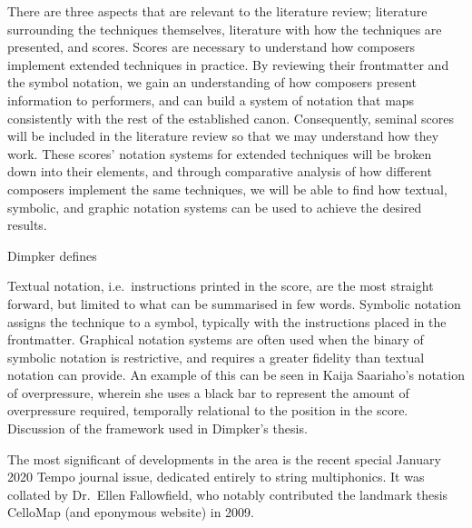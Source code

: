 There are three aspects that are relevant to the literature review; literature surrounding the techniques themselves, literature with how the techniques are presented, and scores. 
Scores are necessary to understand how composers implement extended techniques in practice.
By reviewing their frontmatter and the symbol notation, we gain an understanding of how composers present information to performers, and can build a system of notation that maps consistently with the rest of the established canon.
Consequently, seminal scores will be included in the literature review so that we may understand how they work. 
These scores' notation systems for extended techniques will be broken down into their elements, and through comparative analysis of how different composers implement the same techniques, we will be able to find how textual, symbolic, and graphic notation systems can be used to achieve the desired results.

Dimpker defines 

Textual notation, i.e.\ instructions printed in the score, are the most straight forward, but limited to what can be summarised in few words.
Symbolic notation assigns the technique to a symbol, typically with the instructions placed in the frontmatter.
Graphical notation systems are often used when the binary of symbolic notation is restrictive, and requires a greater fidelity than textual notation can provide. 
An example of this can be seen in Kaija Saariaho's notation of overpressure, wherein she uses a black bar to represent the amount of overpressure required, temporally relational to the position in the score.
Discussion of the framework used in Dimpker's thesis.\autocite[23]{dimpkerExtendedNotationDepiction2012}

The most significant of developments in the area is the recent special January 2020 Tempo journal issue, dedicated entirely to string multiphonics.
It was collated by Dr.\ Ellen Fallowfield, who notably contributed the landmark thesis CelloMap (and eponymous website) in 2009.\autocite{fallowfieldCelloMapHandbook2009}